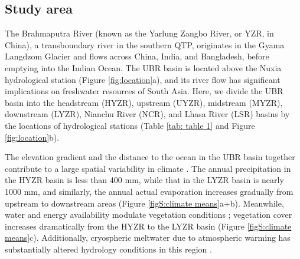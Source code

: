 \documentclass[hess, manuscript]{copernicus}
\begin{document}
\subsection{Study area}
The Brahmaputra River (known as the Yarlung Zangbo River, or YZR, in China), a transboundary river in the southern QTP, originates in the Gyama Langdzom Glacier and flows across China, India, and Bangladesh, before emptying into the Indian Ocean. The UBR basin is located above the Nuxia hydrological station (Figure \ref{fig:location}a), and its river flow has significant implications on freshwater resources of South Asia. 
Here, we divide the UBR basin into the headstream (HYZR), upstream (UYZR), midstream (MYZR), downstream (LYZR), Nianchu River (NCR), and Lhasa River (LSR) basins by the locations of hydrological stations (Table \ref{tab: table 1} and Figure \ref{fig:location}b).

The elevation gradient and the distance to the ocean in the UBR basin together contribute to a large spatial variability in climate \citep{sang2016precipitation}. 
The annual precipitation in the HYZR basin is less than 400 mm, while that in the  LYZR basin is nearly 1000 mm, and similarly, the annual actual evaporation increases gradually from upstream to downstream areas (Figure \ref{figS:climate means}a+b).
Meanwhile, water and energy availability modulate vegetation conditions \citep{li2019greening}; vegetation cover increases dramatically from the HYZR to the LYZR basin (Figure \ref{figS:climate means}c). Additionally, cryospheric meltwater due to atmospheric warming has substantially altered hydrology conditions in this region \citep{cuo2019warming,yao2010glacial,wang2021tp}.
\end{document}
